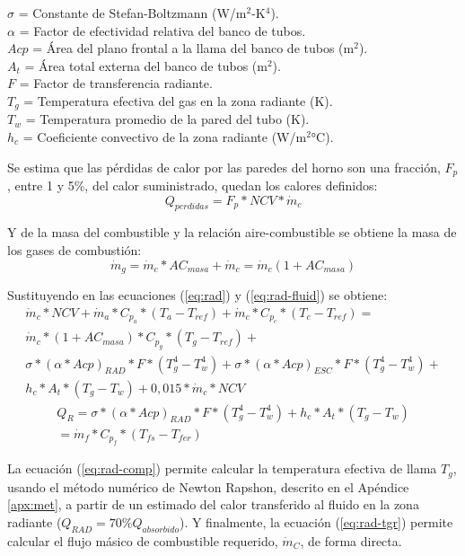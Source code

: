 $\sigma$ = Constante de Stefan-Boltzmann (W/m$^2$-K$^4$).\\
$\alpha$ = Factor de efectividad relativa del banco de tubos.\\
$Acp$ = Área del plano frontal a la llama del banco de tubos (m$^2$).\\
$A_t$ = Área total externa del banco de tubos (m$^2$).\\
$F$ = Factor de transferencia radiante.\\
$T_g$ = Temperatura efectiva del gas en la zona radiante (K).\\
$T_w$ = Temperatura promedio de la pared del tubo (K).\\
$h_c$ = Coeficiente convectivo de la zona radiante (W/m$^2$°C).
\par Se estima que las pérdidas de calor por las paredes del horno son una fracción, $F_p$, entre 1 y 5\%, del calor suministrado, quedan los calores definidos:
\begin{equation}
    Q_{perdidas} = F_p * NCV * \dot m_c
\end{equation}
\par Y de la masa del combustible y la relación aire-combustible se obtiene la masa de los gases de combustión:
\begin{equation}
    \dot m_g = \dot m_c * AC_{masa} + \dot m_c = \dot m_c (1 + AC_{masa})
\end{equation}
\par Sustituyendo en las ecuaciones (\ref{eq:rad}) y (\ref{eq:rad-fluid}) se obtiene:
\begin{equation}\label{eq:rad-tgr}
\begin{gathered}
\dot m_c*NCV + \dot m_a*C_{p_a} * (T_a -T_{ref}) 
+ \dot m_c*C_{p_c} * (T_c -T_{ref}) = \\
\dot m_c*(1 +AC_{masa}) * C_{p_g} * (T_g -T_{ref}) + \\
\sigma *(\alpha *Acp)_{RAD}*F*(T_g^4-T_w^4) + 
\sigma *(\alpha *Acp)_{ESC}*F*(T_g^4-T_w^4) + \\
h_{c}*A_t*(T_g -T_w) + 0,015*\dot m_c*NCV
\end{gathered}
\end{equation}
\begin{equation}
\begin{gathered}
\label{eq:rad-comp}
Q_R = 
\sigma * (\alpha *Acp)_{RAD} *F *(T_g^4 -T_w^4) +h_{c} *A_t *(T_g -T_w)\\
= \dot m_f * C_{p_f} * (T_{fs} - T_{fer})
\end{gathered}
\end{equation}
\par La ecuación (\ref{eq:rad-comp}) permite calcular la  temperatura efectiva de llama $T_{g}$, usando el método numérico de Newton Rapshon, descrito en el Apéndice \ref{apx:met}, a partir de un estimado del calor transferido al fluido en la zona radiante ($Q_{RAD} = 70\% Q_{absorbido}$). Y finalmente, la ecuación (\ref{eq:rad-tgr}) permite calcular el flujo másico de combustible requerido, $\dot m_C$, de forma directa.


